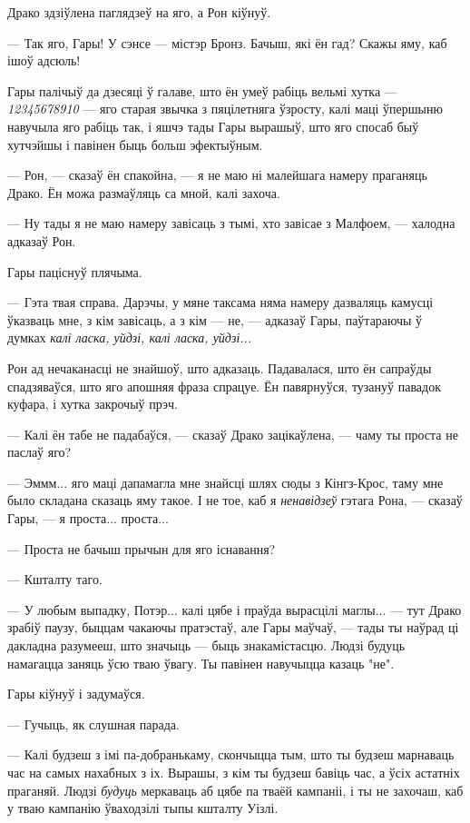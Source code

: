 Драко здзіўлена паглядзеў на яго, а Рон кіўнуў.

--- Так яго, Гары! У сэнсе --- містэр Бронз. Бачыш, які ён гад? Скажы яму, каб 
ішоў адсюль!

Гары палічыў да дзесяці ў галаве, што ён умеў рабіць вельмі хутка --- \emph{12345678910}
--- яго старая звычка з пяцілетняга ўзросту, калі маці ўпершыню навучыла яго рабіць 
так, і яшчэ тады Гары вырашыў, што яго спосаб быў хутчэйшы і павінен быць больш
эфектыўным. 

--- Рон, --- сказаў ён спакойна, --- я не маю ні малейшага намеру праганяць Драко.
Ён можа размаўляць са мной, калі захоча.

--- Ну тады я не маю намеру завісаць з тымі, хто завісае з Малфоем, --- халодна 
адказаў Рон.

Гары паціснуў плячыма.

--- Гэта твая справа. Дарэчы, у мяне таксама няма намеру дазваляць камусці ўказваць
мне, з кім завісаць, а з кім --- не, --- адказаў Гары, паўтараючы ў думках
\emph{калі ласка, уйдзі, калі ласка, уйдзі...}

Рон ад нечаканасці не знайшоў, што адказаць. Падавалася, што ён сапраўды 
спадзяваўся, што яго апошняя фраза спрацуе. Ён павярнуўся, тузануў павадок куфара,
і хутка закрочыў прэч.

--- Калі ён табе не падабаўся, --- сказаў Драко зацікаўлена, --- чаму ты проста 
не паслаў яго?

--- Эммм... яго маці дапамагла мне знайсці шлях сюды з Кінгз-Крос, таму мне 
было складана сказаць яму такое. І не тое, каб я \emph{ненавідзеў} гэтага Рона, 
--- сказаў Гары, --- я проста... проста...

--- Проста не бачыш прычын для яго існавання?

--- Кшталту таго.

--- У любым выпадку, Потэр... калі цябе і праўда вырасцілі маглы... --- 
тут Драко зрабіў паузу, быццам чакаючы пратэстаў, але Гары маўчаў, ---
тады ты наўрад ці дакладна разумееш, што значыць --- быць знакамістасцю.
Людзі будуць намагацца заняць ўсю тваю ўвагу. Ты павінен
навучыцца казаць "не".

Гары кіўнуў і задумаўся.

--- Гучыць, як слушная парада.

--- Калі будзеш з імі па-добранькаму, скончыцца тым, што ты будзеш марнаваць час 
на самых нахабных з іх. Вырашы, з кім ты будзеш бавіць час, а ўсіх астатніх праганяй.
Людзі \emph{будуць} меркаваць аб цябе па тваёй кампаніі, і ты не захочаш, каб 
у тваю кампанію ўваходзілі тыпы кшталту Уізлі.

